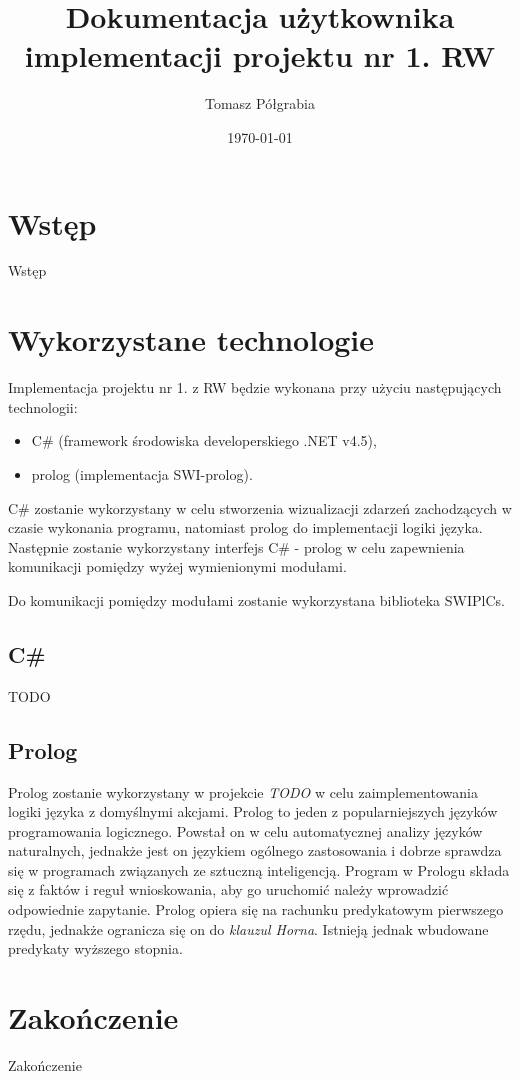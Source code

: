 \documentclass[a4paper]{article}
\title{Dokumentacja użytkownika implementacji projektu nr 1. RW}
\author{Tomasz Półgrabia}
\date{\today}
\begin{document}
\maketitle

\begin{abstract}

\end{abstract}

\section{Wstęp}
	Wstęp

\section{Wykorzystane technologie}
	Implementacja projektu nr 1. z RW będzie wykonana przy użyciu następujących technologii:
    \begin{itemize}
    	\item C\# (framework środowiska developerskiego .NET v4.5),
        \item prolog (implementacja SWI-prolog).
    \end{itemize}
    
    C\# zostanie wykorzystany w celu stworzenia wizualizacji zdarzeń zachodzących w czasie wykonania
    programu, natomiast prolog do implementacji logiki języka. Następnie zostanie wykorzystany
    interfejs C\# - prolog w celu zapewnienia komunikacji pomiędzy wyżej wymienionymi modułami.
    
    Do komunikacji pomiędzy modułami zostanie wykorzystana biblioteka SWIPlCs.
    
    \subsection{C\#}
    	TODO
    
    \subsection{Prolog}
    Prolog zostanie wykorzystany w projekcie \textit{TODO} w celu
    zaimplementowania logiki języka z domyślnymi akcjami. Prolog to
    jeden z popularniejszych języków programowania logicznego. Powstał on
    w celu automatycznej analizy języków naturalnych, jednakże jest on
    językiem ogólnego zastosowania i dobrze sprawdza się w programach 
    związanych ze sztuczną inteligencją. Program w Prologu składa się z faktów
    i reguł wnioskowania, aby go uruchomić należy wprowadzić odpowiednie 
    zapytanie. Prolog opiera się na rachunku predykatowym pierwszego rzędu,
    jednakże ogranicza się on do \textit{klauzul Horna}. Istnieją jednak
    wbudowane predykaty wyższego stopnia.

\section{Zakończenie}
	Zakończenie
\end{document}
